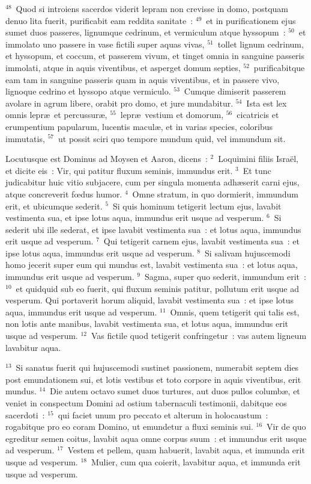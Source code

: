 ${}^{48}$~Quod si introiens sacerdos viderit lepram non crevisse in domo, postquam denuo lita fuerit, purificabit eam reddita sanitate~:
${}^{49}$~et in purificationem ejus sumet duos passeres, lignumque cedrinum, et vermiculum atque hyssopum~:
${}^{50}$~et immolato uno passere in vase fictili super aquas vivas,
${}^{51}$~tollet lignum cedrinum, et hyssopum, et coccum, et passerem vivum, et tinget omnia in sanguine passeris immolati, atque in aquis viventibus, et asperget domum septies,
${}^{52}$~purificabitque eam tam in sanguine passeris quam in aquis viventibus, et in passere vivo, lignoque cedrino et hyssopo atque vermiculo.
${}^{53}$~Cumque dimiserit passerem avolare in agrum libere, orabit pro domo, et jure mundabitur.
${}^{54}$~Ista est lex omnis lepr\ae\ et percussur\ae ,
${}^{55}$~lepr\ae\ vestium et domorum,
${}^{56}$~cicatricis et erumpentium papularum, lucentis macul\ae , et in varias species, coloribus immutatis,
${}^{57}$~ut possit sciri quo tempore mundum quid, vel immundum sit.

\lettrine[lines=3,image=true,loversize=0.05,lraise=-0.03]{L}{}ocutusque est Dominus ad Moysen et Aaron, dicens~:
${}^{2}$~Loquimini filiis Isra\"el, et dicite eis~: Vir, qui patitur fluxum seminis, immundus erit.
${}^{3}$~Et tunc judicabitur huic vitio subjacere, cum per singula momenta adh\ae serit carni ejus, atque concreverit fœdus humor.
${}^{4}$~Omne stratum, in quo dormierit, immundum erit, et ubicumque sederit.
${}^{5}$~Si quis hominum tetigerit lectum ejus, lavabit vestimenta sua, et ipse lotus aqua, immundus erit usque ad vesperum.
${}^{6}$~Si sederit ubi ille sederat, et ipse lavabit vestimenta sua~: et lotus aqua, immundus erit usque ad vesperum.
${}^{7}$~Qui tetigerit carnem ejus, lavabit vestimenta sua~: et ipse lotus aqua, immundus erit usque ad vesperum.
${}^{8}$~Si salivam hujuscemodi homo jecerit super eum qui mundus est, lavabit vestimenta sua~: et lotus aqua, immundus erit usque ad vesperum.
${}^{9}$~Sagma, super quo sederit, immundum erit~:
${}^{10}$~et quidquid sub eo fuerit, qui fluxum seminis patitur, pollutum erit usque ad vesperum. Qui portaverit horum aliquid, lavabit vestimenta sua~: et ipse lotus aqua, immundus erit usque ad vesperum.
${}^{11}$~Omnis, quem tetigerit qui talis est, non lotis ante manibus, lavabit vestimenta sua, et lotus aqua, immundus erit usque ad vesperum.
${}^{12}$~Vas fictile quod tetigerit confringetur~: vas autem ligneum lavabitur aqua.


${}^{13}$~Si sanatus fuerit qui hujuscemodi sustinet passionem, numerabit septem dies post emundationem sui, et lotis vestibus et toto corpore in aquis viventibus, erit mundus.
${}^{14}$~Die autem octavo sumet duos turtures, aut duos pullos columb\ae , et veniet in conspectum Domini ad ostium tabernaculi testimonii, dabitque eos sacerdoti~:
${}^{15}$~qui faciet unum pro peccato et alterum in holocaustum~: rogabitque pro eo coram Domino, ut emundetur a fluxi seminis sui.
${}^{16}$~Vir de quo egreditur semen coitus, lavabit aqua omne corpus suum~: et immundus erit usque ad vesperum.
${}^{17}$~Vestem et pellem, quam habuerit, lavabit aqua, et immunda erit usque ad vesperum.
${}^{18}$~Mulier, cum qua coierit, lavabitur aqua, et immunda erit usque ad vesperum.


